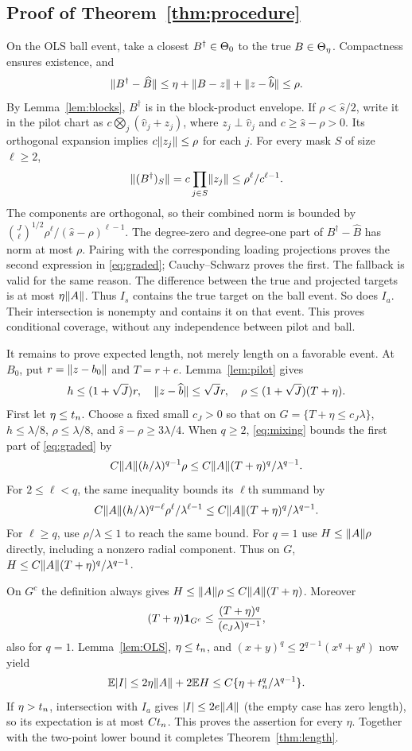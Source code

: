 \subsection{Proof of Theorem~\ref{thm:procedure}}
On the OLS ball event, take a closest $B^\dagger\in\Theta_0$ to the true $B\in\Theta_\eta$. Compactness ensures existence, and
\[
 \lVert B^\dagger-\widehat B\rVert\le\eta+\lVert B-z\rVert+\lVert z-\widehat b\rVert\le\rho.
\]
By Lemma~\ref{lem:blocks}, $B^\dagger$ is in the block-product envelope. If $\rho<\widehat s/2$, write it in the pilot chart as $c\bigotimes_j(\widehat v_j+z_j)$, where $z_j\perp\widehat v_j$ and $c\ge\widehat s-\rho>0$. Its orthogonal expansion implies $c\lVert z_j\rVert\le\rho$ for each $j$. For every mask $S$ of size $\ell\ge2$,
\[
 \lVert (B^\dagger)_S\rVert=c\prod_{j\in S}\lVert z_j\rVert
 \le\rho^\ell/c^{\ell-1}.
\]
The components are orthogonal, so their combined norm is bounded by $\binom{J}{\ell}^{1/2}\rho^\ell/(\widehat s-\rho)^{\ell-1}$. The degree-zero and degree-one part of $B^\dagger-\widehat B$ has norm at most $\rho$. Pairing with the corresponding loading projections proves the second expression in \eqref{eq:graded}; Cauchy--Schwarz proves the first. The fallback is valid for the same reason. The difference between the true and projected targets is at most $\eta\lVert A\rVert$. Thus $I_s$ contains the true target on the ball event. So does $I_a$. Their intersection is nonempty and contains it on that event. This proves conditional coverage, without any independence between pilot and ball.

It remains to prove expected length, not merely length on a favorable event. At $B_0$, put $r=\lVert z-b_0\rVert$ and $T=r+e$. Lemma~\ref{lem:pilot} gives
\[
 h\le(1+\sqrt J)r,\quad \lVert z-\widehat b\rVert\le\sqrt J r,
 \quad\rho\le(1+\sqrt J)(T+\eta).
\]
First let $\eta\le t_n$. Choose a fixed small $c_J>0$ so that on $G=\{T+\eta\le c_J\lambda\}$, $h\le\lambda/8$, $\rho\le\lambda/8$, and $\widehat s-\rho\ge3\lambda/4$. When $q\ge2$, \eqref{eq:mixing} bounds the first part of \eqref{eq:graded} by
\[
 C\lVert A\rVert(h/\lambda)^{q-1}\rho
 \le C\lVert A\rVert(T+\eta)^q/\lambda^{q-1}.
\]
For $2\le\ell<q$, the same inequality bounds its $\ell$th summand by
\[
 C\lVert A\rVert(h/\lambda)^{q-\ell}\rho^\ell/\lambda^{\ell-1}
 \le C\lVert A\rVert(T+\eta)^q/\lambda^{q-1}.
\]
For $\ell\ge q$, use $\rho/\lambda\le1$ to reach the same bound. For $q=1$ use $H\le\lVert A\rVert\rho$ directly, including a nonzero radial component. Thus on $G$, $H\le C\lVert A\rVert(T+\eta)^q/\lambda^{q-1}$.

On $G^c$ the definition always gives $H\le\lVert A\rVert\rho\le C\lVert A\rVert(T+\eta)$. Moreover
\[
 (T+\eta)\mathbf 1_{G^c}\le
 \frac{(T+\eta)^q}{(c_J\lambda)^{q-1}},
\]
also for $q=1$. Lemma~\ref{lem:OLS}, $\eta\le t_n$, and $(x+y)^q\le2^{q-1}(x^q+y^q)$ now yield
\[
 \mathbb E|I|\le2\eta\lVert A\rVert+2\mathbb E H
 \le C\{\eta+t_n^q/\lambda^{q-1}\}.
\]
If $\eta>t_n$, intersection with $I_a$ gives $|I|\le2e\lVert A\rVert$ (the empty case has zero length), so its expectation is at most $Ct_n$. This proves the assertion for every $\eta$. Together with the two-point lower bound it completes Theorem~\ref{thm:length}.

